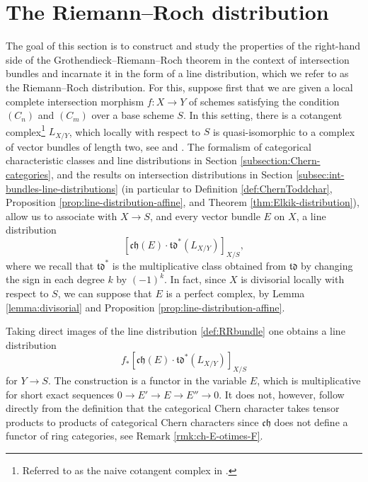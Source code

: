 \documentclass[11pt]{article}
\theoremstyle{plain}
\theoremstyle{definition}
\newcommand{\chfrak}{\mathfrak {ch}}
\newcommand{\tdfrak}{\mathfrak {td}}
\begin{document}
\section{The Riemann--Roch distribution}\label{sec:RR-distribution}
The goal of this section is to construct and study the properties of the right-hand side of the Grothendieck--Riemann--Roch theorem in the context of intersection bundles and incarnate it in the form of a line distribution, which we refer to as the Riemann--Roch distribution. For this, suppose first that we are given a local complete intersection morphism $f \colon X \to Y$ of schemes satisfying the condition $(C_n)$ and $(C_m)$ over a base scheme $S$. In this setting, there is a cotangent complex\footnote{Referred to as the naive cotangent complex in \cite[\href{https://stacks.math.columbia.edu/tag/08P5}{08P5}]{stacks-project}.} $L_{X/Y}$, which locally with respect to $S$ is quasi-isomorphic to a complex of vector bundles of length two, see \cite[\href{https://stacks.math.columbia.edu/tag/08TJ}{08TJ}]{stacks-project} and \cite[\href{https://stacks.math.columbia.edu/tag/0FV4}{0FV4}]{stacks-project}. The formalism of categorical characteristic classes and line distributions in Section \ref{subsection:Chern-categories}, and the results on intersection distributions in Section \ref{subsec:int-bundles-line-distributions} (in particular to Definition \ref{def:ChernToddchar}, Proposition \ref{prop:line-distribution-affine}, and Theorem \ref{thm:Elkik-distribution}), allow us to associate with $X\to S$, and every vector bundle $E$ on $X$, a line distribution
\begin{equation}\label{def:RRbundle}
[\chfrak(E)\cdot \tdfrak^{*}(L_{X/Y})]_{X/S},
\end{equation}
where we recall that $\tdfrak^\ast$ is the multiplicative class obtained from $\tdfrak$ by changing the sign in each degree $k$ by $(-1)^{k}$. In fact, since $X$ is divisorial locally with respect to $S$, we can suppose that $E$ is a perfect complex, by Lemma \ref{lemma:divisorial} and Proposition \ref{prop:line-distribution-affine}.

Taking direct images of the line distribution \eqref{def:RRbundle} one obtains a line distribution
\begin{equation}\label{def:RRdistribution}
f_\ast [\chfrak(E)\cdot \tdfrak^{*}(L_{X/Y})]_{X/S}
\end{equation}
for $Y\to S$. The construction is a functor in the variable $E$, which is multiplicative for short exact sequences $0 \to E' \to E \to E'' \to 0$. It does not, however, follow directly from the definition that the categorical Chern character takes tensor products to products of categorical Chern characters since $\chfrak$ does not define a functor of ring categories, see Remark \ref{rmk:ch-E-otimes-F}.
\end{document}
